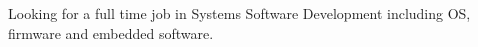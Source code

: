 

\begin{cvparagraph}

Looking for a full time job in Systems Software Development including OS, firmware and embedded software.
\end{cvparagraph}
